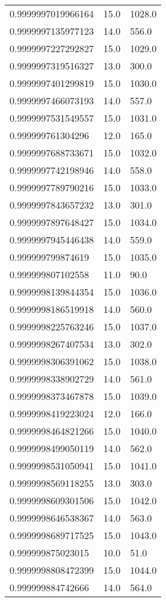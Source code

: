 \begin{center}
\begin{supertabular}[H]{p{0.30\textwidth}p{0.05\textwidth}p{0.05\textwidth}}
0.9999997019966164 & 15.0 & 1028.0 \\ 
0.9999997135977123 & 14.0 & 556.0 \\ 
0.9999997227292827 & 15.0 & 1029.0 \\ 
0.9999997319516327 & 13.0 & 300.0 \\ 
0.9999997401299819 & 15.0 & 1030.0 \\ 
0.9999997466073193 & 14.0 & 557.0 \\ 
0.9999997531549557 & 15.0 & 1031.0 \\ 
0.999999761304296 & 12.0 & 165.0 \\ 
0.9999997688733671 & 15.0 & 1032.0 \\ 
0.9999997742198946 & 14.0 & 558.0 \\ 
0.9999997789790216 & 15.0 & 1033.0 \\ 
0.9999997843657232 & 13.0 & 301.0 \\ 
0.9999997897648427 & 15.0 & 1034.0 \\ 
0.9999997945446438 & 14.0 & 559.0 \\ 
0.999999799874619 & 15.0 & 1035.0 \\ 
0.999999807102558 & 11.0 & 90.0 \\ 
0.9999998139844354 & 15.0 & 1036.0 \\ 
0.9999998186519918 & 14.0 & 560.0 \\ 
0.9999998225763246 & 15.0 & 1037.0 \\ 
0.9999998267407534 & 13.0 & 302.0 \\ 
0.9999998306391062 & 15.0 & 1038.0 \\ 
0.9999998338902729 & 14.0 & 561.0 \\ 
0.9999998373467878 & 15.0 & 1039.0 \\ 
0.9999998419223024 & 12.0 & 166.0 \\ 
0.9999998464821266 & 15.0 & 1040.0 \\ 
0.9999998499050119 & 14.0 & 562.0 \\ 
0.9999998531050941 & 15.0 & 1041.0 \\ 
0.9999998569118255 & 13.0 & 303.0 \\ 
0.9999998609301506 & 15.0 & 1042.0 \\ 
0.9999998646538367 & 14.0 & 563.0 \\ 
0.9999998689717525 & 15.0 & 1043.0 \\ 
0.999999875023015 & 10.0 & 51.0 \\ 
0.9999998808472399 & 15.0 & 1044.0 \\ 
0.999999884742666 & 14.0 & 564.0 \\ 

\end{supertabular}
\end{center}
